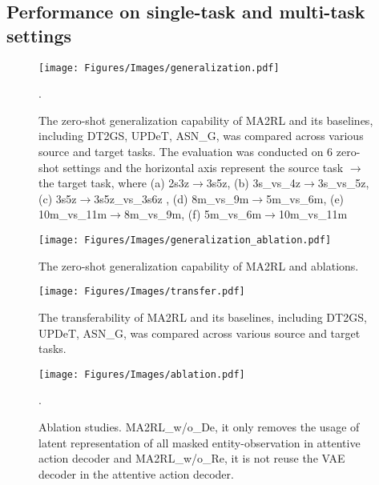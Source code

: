 \subsection{Performance on single-task and multi-task settings}
\label{subsec:multi-task}
\begin{figure*}[ht]
    \centering
    \texttt{[image: Figures/Images/generalization.pdf]}
    \caption{The zero-shot generalization capability of MA2RL and its baselines, including DT2GS, UPDeT, ASN\_G, was compared across various source and target tasks. The evaluation was conducted on 6 zero-shot settings and the horizontal axis represent the source task $\rightarrow$ the target task, where (a) 2s3z$\rightarrow$3s5z, (b) 3s\_vs\_4z$\rightarrow$3s\_vs\_5z, (c) 3s5z$\rightarrow$3s5z\_vs\_3s6z , (d) 8m\_vs\_9m$\rightarrow$5m\_vs\_6m, (e) 10m\_vs\_11m$\rightarrow$8m\_vs\_9m, (f) 5m\_vs\_6m$\rightarrow$10m\_vs\_11m}.
\label{fig:generalization}
\end{figure*}
\begin{figure*}[ht]
    \centering
    \texttt{[image: Figures/Images/generalization\_ablation.pdf]}
    \caption{The zero-shot generalization capability of MA2RL and ablations.}
\label{fig:generalization_ablation}
\end{figure*}


\begin{figure*}[t]
    \centering
    \texttt{[image: Figures/Images/transfer.pdf]}
    \caption{The transferability of MA2RL and its baselines, including DT2GS, UPDeT, ASN\_G, was compared across various source and target tasks.}
\label{fig:transfer}
\end{figure*}
\begin{figure*}[ht]
    \centering
    \texttt{[image: Figures/Images/ablation.pdf]}
    \caption{Ablation studies. MA2RL\_w/o\_De, it only removes the usage of latent representation of all masked entity-observation in attentive action decoder and MA2RL\_w/o\_Re, it is not reuse the VAE decoder in the attentive action decoder.}.
\label{fig:ablation}
\end{figure*}

